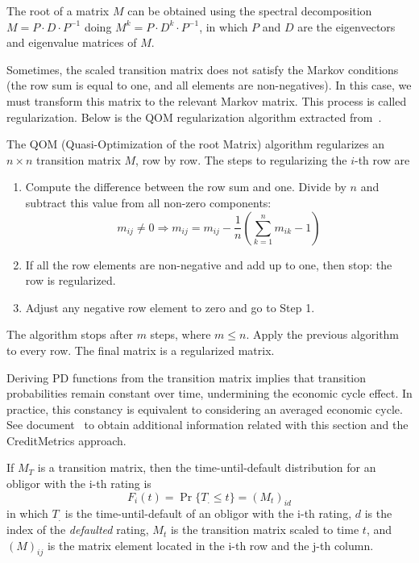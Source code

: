 \documentclass[11pt,fleqn]{book} %
\begin{document}
The root of a matrix $M$ can be obtained using the spectral decomposition
$M = P \cdot D \cdot P^{-1}$ doing $M^{k} = P \cdot D^{k} \cdot P^{-1}$, 
in which $P$ and $D$ are the eigenvectors and eigenvalue matrices of $M$. 

Sometimes, the scaled transition matrix does not satisfy the Markov conditions
(the row sum is equal to one, and all elements are non-negatives). In this case, 
we must transform this matrix to the relevant Markov matrix. This process is 
called regularization. Below is the QOM regularization algorithm extracted 
from~\cite{kreinin:2001}.

\begin{algorithm}
	The QOM (Quasi-Optimization of the root Matrix) algorithm regularizes an 
	$n {\times} n$ transition matrix $M$, row by row. The steps to 
	regularizing the $i$-th row are
	\begin{enumerate}
		\item Compute the difference between the row sum and one. 
		Divide by $n$ and subtract this value from all non-zero components:
		\begin{displaymath}
			m_{ij} \ne 0 
			\Longrightarrow 
			m_{ij} = m_{ij} - \frac{1}{n} \left( \sum_{k=1}^{n} m_{ik} - 1\right)
		\end{displaymath}
		\item If all the row elements are non-negative and add up to one, 
		then stop: the row is regularized.
		\item Adjust any negative row element to zero and go to Step 1.
	\end{enumerate}
	The algorithm stops after $m$ steps, where $m \le n$. 
	Apply the previous algorithm to every row.
	The final matrix is a regularized matrix. 
\end{algorithm}

Deriving PD functions from the transition matrix implies that transition 
probabilities remain constant over time, undermining the economic cycle 
effect. In practice, this constancy is equivalent to considering an averaged 
economic cycle. See document~\cite[sec. 3.2.1]{bindseil:2007} to obtain 
additional information related with this section and the 
CreditMetrics\texttrademark{} approach.

\begin{proposition}
	\label{prop:pdftm}
	If $M_T$ is a transition matrix, then the time-until-default distribution 
	for an obligor with the i-th rating is
	\begin{displaymath}
		F_i(t) = \Pr\{T_. \le t\} = \left( M_t \right)_{id}
	\end{displaymath}
	in which $T_.$ is the time-until-default of an obligor with the i-th rating, 
	$d$ is the index of the \emph{defaulted} rating, $M_t$ is the transition 
	matrix scaled to time $t$, and $(M)_{ij}$ is the matrix element located in 
	the i-th row and the j-th column.
\end{proposition}
\end{document}
